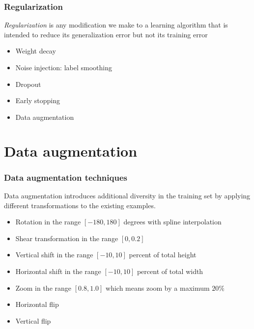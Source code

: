 \documentclass{beamer}
\begin{document}
%
%

\begin{frame}
\frametitle{Regularization}

\begin{definition}
\textit{Regularization} is any modification we make to a learning algorithm that is intended to reduce its generalization error but not its training error
\end{definition}

\begin{itemize}
\item Weight decay
\item Noise injection: label smoothing
\item Dropout
\item Early stopping
\item Data augmentation
\end{itemize}

\end{frame}

%
%

\section{Data augmentation}
\begin{frame}
\frametitle{Data augmentation techniques}

Data augmentation introduces additional diversity in the training set by applying different transformations to the existing examples.
\vskip 0.2in
\begin{itemize}
\item Rotation in the range $[-180, 180]$ degrees with spline interpolation
\item Shear transformation in the range $[0, 0.2]$
\item Vertical shift in the range $[-10, 10]$ percent of total height
\item Horizontal shift in the range $[-10, 10]$ percent of total width
\item Zoom in the range $[0.8, 1.0]$ which means zoom by a maximum $20\%$
\item Horizontal flip
\item Vertical flip
\end{itemize}

\end{frame}
\end{document}

